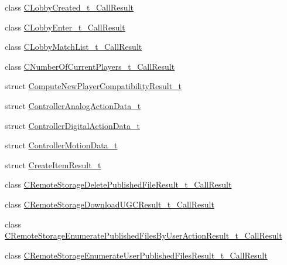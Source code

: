 \begin{DoxyCompactItemize}
\item 
class \hyperlink{class_valve_1_1_steamworks_1_1_c_lobby_created__t___call_result}{C\+Lobby\+Created\+\_\+t\+\_\+\+Call\+Result}
\item 
class \hyperlink{class_valve_1_1_steamworks_1_1_c_lobby_enter__t___call_result}{C\+Lobby\+Enter\+\_\+t\+\_\+\+Call\+Result}
\item 
class \hyperlink{class_valve_1_1_steamworks_1_1_c_lobby_match_list__t___call_result}{C\+Lobby\+Match\+List\+\_\+t\+\_\+\+Call\+Result}
\item 
class \hyperlink{class_valve_1_1_steamworks_1_1_c_number_of_current_players__t___call_result}{C\+Number\+Of\+Current\+Players\+\_\+t\+\_\+\+Call\+Result}
\item 
struct \hyperlink{struct_valve_1_1_steamworks_1_1_compute_new_player_compatibility_result__t}{Compute\+New\+Player\+Compatibility\+Result\+\_\+t}
\item 
struct \hyperlink{struct_valve_1_1_steamworks_1_1_controller_analog_action_data__t}{Controller\+Analog\+Action\+Data\+\_\+t}
\item 
struct \hyperlink{struct_valve_1_1_steamworks_1_1_controller_digital_action_data__t}{Controller\+Digital\+Action\+Data\+\_\+t}
\item 
struct \hyperlink{struct_valve_1_1_steamworks_1_1_controller_motion_data__t}{Controller\+Motion\+Data\+\_\+t}
\item 
struct \hyperlink{struct_valve_1_1_steamworks_1_1_create_item_result__t}{Create\+Item\+Result\+\_\+t}
\item 
class \hyperlink{class_valve_1_1_steamworks_1_1_c_remote_storage_delete_published_file_result__t___call_result}{C\+Remote\+Storage\+Delete\+Published\+File\+Result\+\_\+t\+\_\+\+Call\+Result}
\item 
class \hyperlink{class_valve_1_1_steamworks_1_1_c_remote_storage_download_u_g_c_result__t___call_result}{C\+Remote\+Storage\+Download\+U\+G\+C\+Result\+\_\+t\+\_\+\+Call\+Result}
\item 
class \hyperlink{class_valve_1_1_steamworks_1_1_c_remote_storage_enumerate_published_files_by_user_action_result__t___call_result}{C\+Remote\+Storage\+Enumerate\+Published\+Files\+By\+User\+Action\+Result\+\_\+t\+\_\+\+Call\+Result}
\item 
class \hyperlink{class_valve_1_1_steamworks_1_1_c_remote_storage_enumerate_user_published_files_result__t___call_result}{C\+Remote\+Storage\+Enumerate\+User\+Published\+Files\+Result\+\_\+t\+\_\+\+Call\+Result}
\item 

\end{DoxyCompactItemize}
